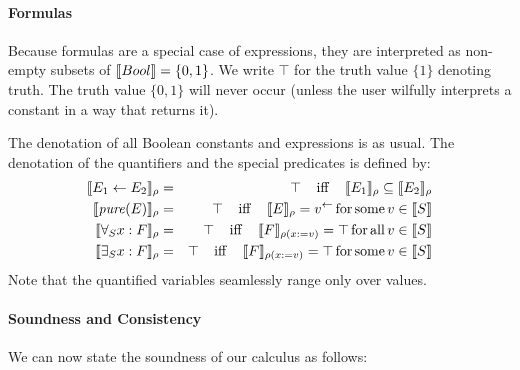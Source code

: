 \documentclass{llncs}
\newcommand{\Conid}[1]{\mathit{#1}}
\newcommand\hsforall{\global\let\hsdot=\hsperiodonce}
\newcommand*\hsperiodonce[2]{#2\global\let\hsdot=\hscompose}
\newcommand*\hscompose[2]{#1}
\begin{document}
\paragraph{Formulas}
Because formulas are a special case of expressions, they are interpreted as non-empty subsets of $\llbracket Bool\rrbracket=\{0,1\}$.
We write $\top$ for the truth value $\{1\}$ denoting truth.
The truth value $\{0,1\}$ will never occur (unless the user wilfully interprets a constant in a way that returns it).

The denotation of all Boolean constants and expressions is as usual.
The denotation of the quantifiers and the special predicates is defined by:
\begin{eqnarray}
\llbracket E_1\leftarrow E_2\rrbracket_{\rho}&=& \top \;\;\;\;\mathrm{iff}\;\;\;\; \llbracket E_1\rrbracket_{\rho}\subseteq\llbracket E_2\rrbracket_{\rho}\\
\llbracket\mathit{pure}(E)\rrbracket_{\rho}        &=&  \top  \;\;\;\;\mathrm{iff}\;\;\;\; \llbracket E\rrbracket_{\rho}=v^\leftarrow \mathrm{\,for\,some\,} v\in\llbracket S\rrbracket\\
\llbracket\forall_S x : F\rrbracket_{\rho} &=&  \top  \;\;\;\;\mathrm{iff}\;\;\;\; \llbracket F\rrbracket_{\rho(x:=v)} = \top \mathrm{\,for\,all\,} v\in\llbracket S\rrbracket \\
\llbracket\exists_S x : F\rrbracket_{\rho} &=&  \top  \;\;\;\;\mathrm{iff}\;\;\;\; \llbracket F\rrbracket_{\rho(x:=v)} = \top \mathrm{\,for\,some\,} v\in\llbracket S\rrbracket 
\end{eqnarray}
Note that the quantified variables seamlessly range only over values.


\paragraph{Soundness and Consistency}
We can now state the soundness of our calculus as follows:
\end{document}
